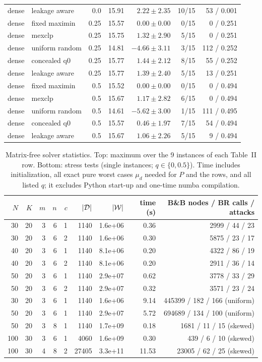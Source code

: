 \begin{table}[h]
\begin{tabular}{@{}llrrrrr@{}}
dense & leakage aware & 0.0 & 15.91 & $2.22\pm2.35$ & 10/15 & 53 / 0.001\\
dense & fixed maximin & 0.25 & 15.57 & $0.00\pm0.00$ & 0/15 & 0 / 0.251\\
dense & mexclp & 0.25 & 15.75 & $1.32\pm2.90$ & 5/15 & 0 / 0.251\\
dense & uniform random & 0.25 & 14.81 & $-4.66\pm3.11$ & 3/15 & 112 / 0.252\\
dense & concealed q0 & 0.25 & 15.77 & $1.44\pm2.12$ & 8/15 & 55 / 0.252\\
dense & leakage aware & 0.25 & 15.77 & $1.39\pm2.40$ & 5/15 & 13 / 0.251\\
dense & fixed maximin & 0.5 & 15.52 & $0.00\pm0.00$ & 0/15 & 0 / 0.494\\
dense & mexclp & 0.5 & 15.67 & $1.17\pm2.82$ & 6/15 & 0 / 0.494\\
dense & uniform random & 0.5 & 14.61 & $-5.62\pm3.00$ & 1/15 & 111 / 0.495\\
dense & concealed q0 & 0.5 & 15.57 & $0.46\pm1.97$ & 7/15 & 54 / 0.494\\
dense & leakage aware & 0.5 & 15.67 & $1.06\pm2.26$ & 5/15 & 9 / 0.494\\
\bottomrule\end{tabular}\end{table}
\begin{table}[h]\centering\caption{Matrix-free solver statistics. Top: maximum over the 9 instances of each Table~II row. Bottom: stress tests (single instances; $q\in\{0,0.5\}$). Time includes initialization, all exact pure worst cases $\mu_d$ needed for $P$ and the rows, and all listed $q$; it excludes Python start-up and one-time numba compilation.}\label{tab:s-solver}\scriptsize
\begin{tabular}{@{}rrrrrrrrr@{}}\toprule $N$ & $K$ & $m$ & $n$ & $c$ & $|\mathcal{D}|$ & $|\mathcal{W}|$ & time (s) & B\&B nodes / BR calls / attacks\\\midrule
30 & 20 & 3 & 6 & 1 & 1140 & 1.6e+06 & 0.36 & 2999 / 44 / 23\\
30 & 20 & 3 & 6 & 2 & 1140 & 1.6e+06 & 0.30 & 5875 / 23 / 17\\
40 & 20 & 3 & 6 & 1 & 1140 & 8.1e+06 & 0.20 & 4322 / 86 / 19\\
40 & 20 & 3 & 6 & 2 & 1140 & 8.1e+06 & 0.20 & 2911 / 36 / 14\\
50 & 20 & 3 & 6 & 1 & 1140 & 2.9e+07 & 0.62 & 3778 / 33 / 29\\
50 & 20 & 3 & 6 & 2 & 1140 & 2.9e+07 & 0.32 & 3571 / 23 / 24\\
\midrule
30 & 20 & 3 & 6 & 1 & 1140 & 1.6e+06 & 9.14 & 445399 / 182 / 166 (uniform)\\
50 & 20 & 3 & 6 & 1 & 1140 & 2.9e+07 & 5.72 & 694689 / 134 / 100 (uniform)\\
50 & 20 & 3 & 8 & 1 & 1140 & 1.7e+09 & 0.18 & 1681 / 11 / 15 (skewed)\\
100 & 30 & 3 & 6 & 1 & 4060 & 1.6e+09 & 0.30 & 439 / 6 / 10 (skewed)\\
100 & 30 & 4 & 8 & 2 & 27405 & 3.3e+11 & 11.53 & 23005 / 62 / 25 (skewed)\\
\bottomrule\end{tabular}\end{table}
